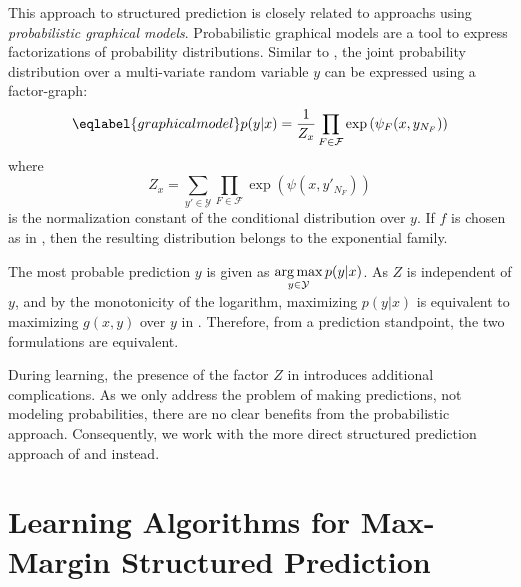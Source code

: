 This approach to structured prediction is closely related to 
approachs using \emph{probabilistic graphical models}.  Probabilistic graphical models are a
tool to express factorizations of probability distributions.  Similar to
, the joint probability distribution over a
multi-variate random variable $y$ can be expressed using a factor-graph:
\begin{equation}\eqlabel{graphicalmodel}
    p(y | x) = \frac{1}{Z_x}\prod_{F \in \mathcal{F}} \exp\left(\psi_F(x, y_{N_F})\right)
\end{equation}
where
\begin{equation}
    Z_x = \sum_{y' \in \mathcal{Y}} \prod_{F \in \mathcal{F}} \exp\left(\psi(x, y'_{N_F})\right)
\end{equation}
is the normalization constant of the conditional distribution over $y$.
If $f$ is chosen as in , then the resulting distribution
belongs to the exponential family.

The most probable prediction $y$ is given as $\displaystyle \operatorname*{arg\,max}_{y \in \mathcal{Y}}p(y|x)$.
As $Z$ is independent of $y$, and by the monotonicity of the logarithm,
maximizing $p(y|x)$ is equivalent to maximizing $g(x,y)$ over $y$ in
. Therefore, from a prediction standpoint, the two
formulations are equivalent.

During learning, the presence of the factor $Z$ in 
introduces additional complications. As we only address the problem of making
predictions, not modeling probabilities, there are no clear benefits from the
probabilistic approach.  Consequently, we work with the more direct
structured prediction approach of  and
 instead.



\section{Learning Algorithms for Max-Margin Structured Prediction}


